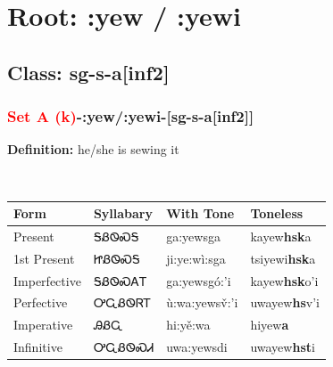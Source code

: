 \needspace{4in}
\section*{Root: :yew / :yewi}
\nopagebreak
{}
\needspace{3in}
\subsection*{Class: sg-s-a[inf2]}
\nopagebreak
\needspace{2in}
\subsubsection*{\textcolor{Red}{Set A (k)}{-}\textbf{:yew/:yewi}{-}[sg-s-a[inf2]]}
\nopagebreak
\textbf{Definition: } he/she is sewing it
\\[0.5em]
\begin{tabularx}{\textwidth}{l X X X}%
\toprule%
\textbf{Form}&\textbf{Syllabary}&\textbf{With Tone}&\textbf{Toneless}\\%
\midrule%
Present&ᎦᏰᏫᏍᎦ&ga:yewsga&kayew\textbf{hsk}a\\%
1st Present&ᏥᏰᏫᏍᎦ&ji:ye:wì:sga&tsiyewi\textbf{hsk}a\\%
Imperfective&ᎦᏰᏫᏍᎪᎢ&ga:yewsgó:’i&kayew\textbf{hsk}o'i\\%
Perfective&ᎤᏩᏰᏫᏒᎢ&ù:wa:yewsv̌:’i&uwayew\textbf{hs}v'i\\%
Imperative&ᎯᏰᏩ&hi:yě:wa&hiyew\textbf{a}\\%
Infinitive&ᎤᏩᏰᏫᏍᏗ&uwa:yewsdi&uwayew\textbf{hst}i\\%
\bottomrule%
\end{tabularx}
\\[1em]